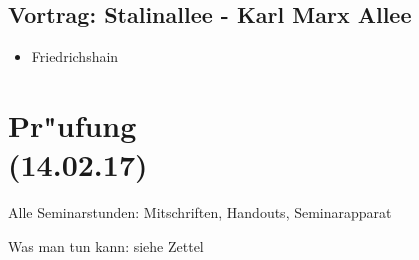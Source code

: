 \documentclass[emulatestandardclasses]{scrartcl}
\begin{document}
\subsection{Vortrag: Stalinallee - Karl Marx Allee}

\begin{itemize}
  \item Friedrichshain
\end{itemize}

\section{Pr"ufung\\(14.02.17)}

Alle Seminarstunden: Mitschriften, Handouts, Seminarapparat

Was man tun kann: siehe Zettel


%
\end{document}
